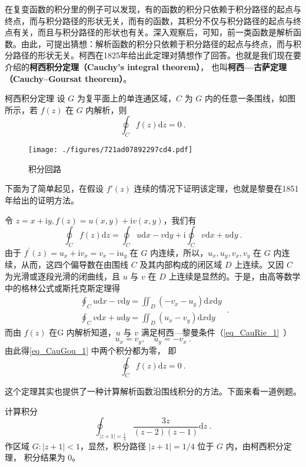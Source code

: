 


在复变函数的积分里的例子可以发现，有的函数的积分只依赖于积分路径的起点与终点，而与积分路径的形状无关，而有的函数，其积分不仅与积分路径的起点与终点有关，而且与积分路径的形状也有关。深入观察后，可知，前一类函数是解析函数。由此，可提出猜想：解析函数的积分只依赖于积分路径的起点与终点，而与积分路径的形状无关。柯西在1825年给出此定理对猜想作了回答。也就是我们现在要介绍的\textbf{柯西积分定理（Cauchy's integral theorem）}， 也叫\textbf{柯西—古萨定理（Cauchy–Goursat theorem）}。

\begin{theorem}{柯西积分定理}
设 $G $ 为复平面上的单连通区域，$C $ 为 $G $ 内的任意一条围线，如图所示，若 $f (z)$ 在 $G $ 内解析，则
\begin{equation}
\oint_{C} f(z) \mathrm{d} z=0~.
\end{equation}
\begin{figure}[ht]
\centering
\texttt{[image: ./figures/721ad07892297cd4.pdf]}
\caption{积分回路} \label{fig_CauGou_1}
\end{figure}

下面为了简单起见，在假设 $f'(z)$ 连续的情况下证明该定理，也就是黎曼在1851年给出的证明方法。

令 $z=x+\mathrm{i} y, f(z)=u(x, y)+\mathrm{i} v(x, y)$，我们有
\begin{equation}
\oint_{C} f(z) \mathrm{d} z=\oint_{C} u \mathrm{d} x-v \mathrm{d} y+\mathrm{i} \oint_{C} v \mathrm{d} x+u \mathrm{d} y~.
\end{equation}
由于 $f^{\prime}(z)=u_{x}+\mathrm{i} v_{x}=v_{x}-\mathrm{i} u_{y}$ 在 $G $ 内连续，所以，$u_{x}, u_{y}, v_{x}, v_{y}$ 在 $G $ 内连续，从而，这四个偏导数在由围线 $C$ 及其内部构成的闭区域 $D $ 上连续。又因 $C $ 为光滑或逐段光滑的闭曲线，且 $u $ 与 $v $ 在 $D $ 上连续是显然的。于是，由高等数学中的格林公式或斯托克斯定理得
\begin{equation}\label{eq_CauGou_1}
\begin{aligned}\oint_C u \mathrm{d} x-v \mathrm{d} y=\iint_{D}\left(-v_{x}-u_{y}\right) \mathrm{d} x \mathrm{d} y \\ \oint_C v \mathrm{d} x+u \mathrm{d} y=\iint_{D}\left(u_{x}-v_{y}\right) \mathrm{d} x \mathrm{d} y\end{aligned}~.
\end{equation}
而由 $ f (z)$ 在G 内解析知道，$u$ 与 $v$ 满足柯西—黎曼条件（\autoref{eq_CauRie_1}~）
\begin{equation}
u_{x}=v_{y}, \quad u_{y}=-v_{x}~.
\end{equation}
由此得\autoref{eq_CauGou_1} 中两个积分都为零， 即
\begin{equation}
\oint_{C} f(z) \mathrm{d} z=0~.
\end{equation}
\end{theorem}
这个定理其实也提供了一种计算解析函数沿围线积分的方法。下面来看一道例题。
\begin{example}{}
计算积分
\begin{equation}
\oint_{|z+1|=\frac{1}{4}} \frac{3 z}{(z-2)(z-1)} \mathrm{d} z~.
\end{equation}
作区域 $G:|z+1|<1$，显然，积分路径 $|z+1|=1/4$ 位于 $G$ 内，由柯西积分定理， 积分结果为 0。
\end{example}
